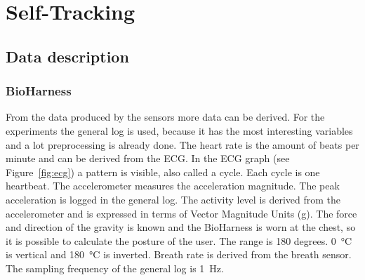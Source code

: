 \section{Self-Tracking}
	\subsection{Data description}
	\label{sec:datadescription}
		\subsubsection{BioHarness}
		From the data produced by the sensors more data can be derived. For the experiments the general log is used, because it has the most interesting variables and a lot preprocessing is already done. The heart rate is the amount of beats per minute and can be derived from the ECG. In the ECG graph (see Figure~\ref{fig:ecg}) a pattern is visible, also called a cycle. Each cycle is one heartbeat. 
			The accelerometer measures the acceleration magnitude. The peak acceleration is logged in the general log.
			The activity level is derived from the accelerometer and is expressed in terms of Vector Magnitude Units (g).
			The force and direction of the gravity is known and the BioHarness is worn at the chest, so it is possible to calculate the posture of the user. The range is 180 degrees. \SI{0}{\celsius} is vertical and \SI{180}{\celsius} is inverted.
			Breath rate is derived from the breath sensor. The sampling frequency of the general log is \SI{1}{\hertz}.

